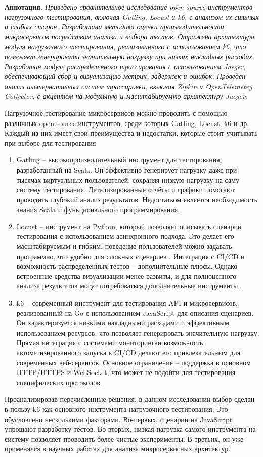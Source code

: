 \textbf{Аннотация. }\textit{Приведено сравнительное исследование open-source инструментов нагрузочного тестирования, включая Gatling, Locust и k6, с анализом их сильных и слабых сторон. Разработана методика оценки производительности микросервисов посредством анализа и выбора тестов. Отражена архитектура модуля нагрузочного тестирования, реализованного с использованием k6, что позволяет генерировать значительную нагрузку при низких накладных расходах. Разработан модуль распределенного трассирования с использованием Jaeger, обеспечивающий сбор и визуализацию метрик, задержек и ошибок. Проведен анализ альтернативных систем трассировки, включая Zipkin и OpenTelemetry Collector, с акцентом на модульную и масштабируемую архитектуру Jaeger.}


Нагрузочное тестирование микросервисов можно проводить с помощью различных open-source инструментов, среди которых Gatling, Locust, k6 и др. Каждый из них имеет свои преимущества и недостатки, которые стоит учитывать при выборе для тестирования.
\begin{enumerate}
\item Gatling\cite{gatling} – высокопроизводительный инструмент для тестирования, разработанный на Scala. Он эффективно генерирует нагрузку даже при тысячах виртуальных пользователей, сохраняя низкую нагрузку на саму систему тестирования. Детализированные отчёты и графики помогают проводить глубокий анализ результатов. Недостатком является необходимость знания Scala и функционального программирования.

\item Locust \cite{locust} – инструмент на Python, который позволяет описывать сценарии тестирования с использованием асинхронного подхода. Это делает его масштабируемым и гибким: поведение пользователей можно задавать программно, что удобно для сложных сценариев \cite{allam2024synthetictimeseriesanomaly}. Интеграция с CI/CD и возможность распределённых тестов – дополнительные плюсы. Однако встроенные средства визуализации менее развиты, и для полноценного анализа результатов могут потребоваться дополнительные инструменты.

\item k6\cite{k6} – современный инструмент для тестирования API и микросервисов, реализованный на Go с использованием JavaScript для описания сценариев. Он характеризуется низкими накладными расходами и эффективным использованием ресурсов, что позволяет генерировать значительную нагрузку. Прямая интеграция с системами мониторингаи возможность автоматизированного запуска в CI/CD делают его привлекательным для современных веб-сервисов. Основное ограничение – поддержка в основном HTTP/HTTPS и WebSocket, что может не подойти для тестирования специфических протоколов.
\end{enumerate}
Проанализировав перечисленные решения, в данном исследовании выбор сделан в пользу k6 как основного инструмента нагрузочного тестирования. Это обусловлено несколькими факторами. Во-первых, сценарии на JavaScript упрощают разработку тестов. Во-вторых, низкая нагрузка самого инструмента на систему позволяет проводить более чистые эксперименты. В-третьих, он уже применялся в научных работах для анализа микросервисных архитектур. \cite{aqasizade2024kubernetesactionexploringperformance}


